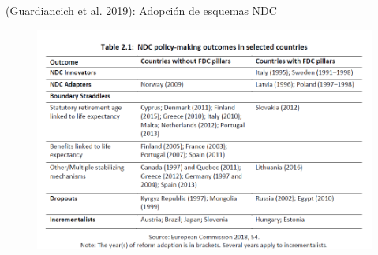 \documentclass[ignorenonframetext,]{beamer}
\begin{document}
\begin{frame}{(Guardiancich et al. 2019): Adopción de esquemas NDC}

\begin{figure}
\centering
\includegraphics{imgs_reforma/reformas.png}
\caption{}
\end{figure}

\end{frame}
\end{document}
